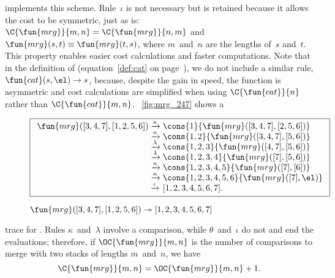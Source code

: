 implements this scheme. Rule~\(\iota\) is not necessary but is
retained because it allows the cost to be symmetric, just as
 is: \(\C{\fun{mrg}}{m,n} =
\C{\fun{mrg}}{n,m}\) and
\(\fun{mrg}(s,t) \equiv \fun{mrg}(t,s)\), where \(m\)~and~\(n\) are
the lengths of~\(s\) and~\(t\). This property enables easier cost
calculations and faster computations. Note that in the definition of
 (equation~\eqref{def:cat} on
page~\pageref{def:cat}), we do not include a similar rule,
\(\fun{cat}(s,\el) \rightarrow s\), because, despite the gain in
speed, the function is asymmetric and cost calculations are simplified
when using \(\C{\fun{cat}}{n}\) rather
than \(\C{\fun{cat}}{m,n}\). \Fig~\vref{fig:mrg_247} shows a
\begin{figure}[b]
\begin{equation*}
\boxed{%
\begin{array}{r@{\;}l@{\;}l}
  \fun{mrg}([3,4,7],[1,2,5,6])
& \xrightarrow{\smash{\kappa}}
& \cons{1}{\fun{mrg}([3,4,7],[2,5,6])}\\
& \xrightarrow{\smash{\kappa}}
& \cons{1,2}{\fun{mrg}([3,4,7],[5,6])}\\
& \xrightarrow{\smash{\lambda}}
& \cons{1,2,3}{\fun{mrg}([4,7],[5,6])}\\
& \xrightarrow{\smash{\lambda}}
& \cons{1,2,3,4}{\fun{mrg}([7],[5,6])}\\
& \xrightarrow{\smash{\kappa}}
& \cons{1,2,3,4,5}{\fun{mrg}([7],[6])}\\
& \xrightarrow{\smash{\kappa}}
& \cons{1,2,3,4,5,6}{\fun{mrg}([7],\el)}\\
& \xrightarrow{\smash{\iota}}
& [1,2,3,4,5,6,7].
\end{array}}
\end{equation*}
\caption{\(\fun{mrg}([3,4,7],[1,2,5,6]) \twoheadrightarrow
  [1,2,3,4,5,6,7]\)}
\label{fig:mrg_247}
\end{figure}
trace for . Rules \(\kappa\)~and~\(\lambda\) involve a
comparison, while \(\theta\)~and~\(\iota\) do not and end the
evaluations; therefore, if
\(\OC{\fun{mrg}}{m,n}\) is the number
of comparisons to merge with  two
stacks of lengths \(m\)~and~\(n\), we have
\begin{equation}
\C{\fun{mrg}}{m,n} = \OC{\fun{mrg}}{m,n} + 1.\label{def:cost_mrg}
\end{equation}
